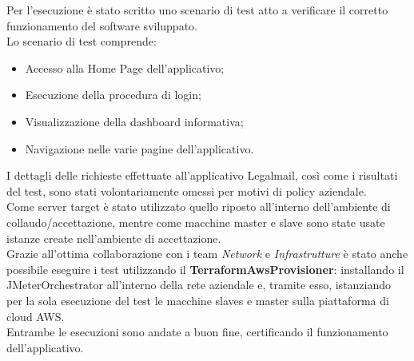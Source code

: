 Per l'esecuzione è stato scritto uno scenario di test atto a verificare il corretto funzionamento del software sviluppato. \\
Lo scenario di test comprende:
\begin{itemize}
	\item Accesso alla Home Page dell'applicativo;
	\item Esecuzione della procedura di login;
	\item Visualizzazione della dashboard informativa;
	\item Navigazione nelle varie pagine dell'applicativo.
\end{itemize}
I dettagli delle richieste effettuate all'applicativo Legalmail, così come i risultati del test, sono stati volontariamente omessi per motivi di policy aziendale.\\
Come server target è stato utilizzato quello riposto all'interno dell'ambiente di collaudo/accettazione, mentre come macchine master e slave sono state usate istanze create nell'ambiente di accettazione. \\
Grazie all'ottima collaborazione con i team \textit{Network} e \textit{Infrastrutture} è stato anche possibile eseguire i test utilizzando il \textbf{TerraformAwsProvisioner}: installando il JMeterOrchestrator all'interno della rete aziendale e, tramite esso, istanziando per la sola esecuzione del test le macchine slaves e master sulla piattaforma di \gls{cloud} AWS. \\
Entrambe le esecuzioni sono andate a buon fine, certificando il funzionamento dell'applicativo.